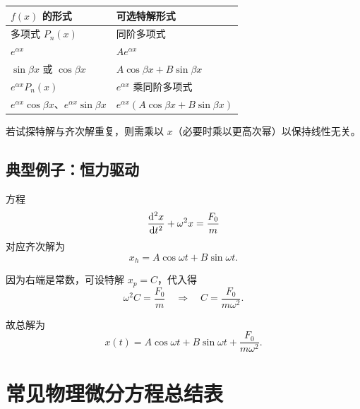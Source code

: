 \begin{center}
\begin{tabular}{ll}
\toprule
$f(x)$ 的形式 & 可选特解形式 \\
\midrule
多项式 $P_n(x)$ & 同阶多项式 \\
$e^{\alpha x}$ & $Ae^{\alpha x}$ \\
$\sin \beta x$ 或 $\cos \beta x$ & $A\cos \beta x+B\sin \beta x$ \\
$e^{\alpha x}P_n(x)$ & $e^{\alpha x}$ 乘同阶多项式 \\
$e^{\alpha x}\cos \beta x$、$e^{\alpha x}\sin \beta x$ & $e^{\alpha x}(A\cos \beta x+B\sin \beta x)$ \\
\bottomrule
\end{tabular}
\end{center}

若试探特解与齐次解重复，则需乘以 $x$（必要时乘以更高次幂）以保持线性无关。

\subsection*{典型例子：恒力驱动}

方程
\[
\dv[2]{x}{t}+\omega^2 x=\frac{F_0}{m}
\]
对应齐次解为
\[
 x_h=A\cos\omega t+B\sin\omega t.
\]

因为右端是常数，可设特解 $x_p=C$，代入得
\[
 \omega^2 C=\frac{F_0}{m}
 \quad\Rightarrow\quad
 C=\frac{F_0}{m\omega^2}.
\]

故总解为
\[
 x(t)=A\cos\omega t+B\sin\omega t+\frac{F_0}{m\omega^2}.
\]

\section{常见物理微分方程总结表}

